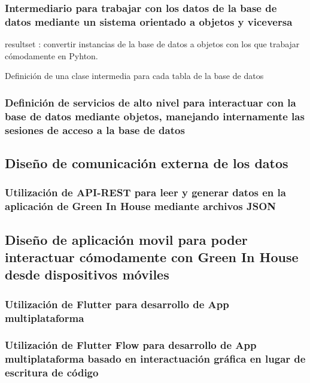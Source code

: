         \subsubsection{Intermediario para trabajar con los datos de la base de datos mediante un sistema orientado a objetos y viceversa}
        resultset : convertir instancias de la base de datos a objetos con los que trabajar cómodamente en Pyhton.
        
            Definición de una clase intermedia para cada tabla de la base de datos
        
        \subsubsection{Definición de servicios de alto nivel para interactuar con la base de datos mediante objetos, manejando internamente las sesiones de acceso a la base de datos}
    
    \subsection{Diseño de comunicación externa de los datos}
    
        \subsubsection{Utilización de API-REST para leer y generar datos en la aplicación de Green In House mediante archivos JSON}
    
        \subsection{Diseño de aplicación movil para poder interactuar cómodamente con Green In House desde dispositivos móviles}
    
            \subsubsection{Utilización de Flutter para desarrollo de App multiplataforma}
            
    
            \subsubsection{Utilización de Flutter Flow para desarrollo de App multiplataforma basado en interactuación gráfica en lugar de escritura de código}
    
    

